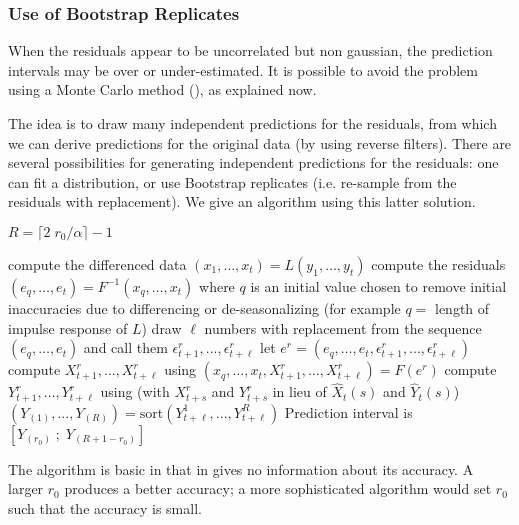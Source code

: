 \subsubsection{Use of Bootstrap Replicates}
\label{sec-mc-arma} When the residuals appear to be
uncorrelated but non gaussian, the prediction
intervals may be over or under-estimated. It is
possible to avoid the problem using a Monte Carlo
method (), as explained now.

The idea is to draw many independent predictions for
the residuals, from which we can derive predictions
for the original data (by using reverse filters).
There are several possibilities for generating
independent predictions for the residuals: one can fit
a distribution, or use Bootstrap replicates (i.e.
re-sample from the residuals with replacement). We
give an algorithm using this latter solution.

\begin{algorithm}
 \begin{algorithmic}[1]
%
  \State $R=\lceil 2 \;r_0/\alpha\rceil-1$ 

  \State compute the differenced data $(x_1,\ldots,x_t)=L(y_1,\ldots,y_t)$
  \State compute the residuals $(e_q,\ldots,e_t)=F^{-1}(x_q,\ldots,x_t)$ where
  $q$ is an initial value chosen to remove initial
  inaccuracies due to differencing or de-seasonalizing (for example $q=$
  length of impulse response of $L$)
    \State draw $\ell$ numbers with replacement from
the sequence $(e_q,\ldots,e_t)$ and call them
$\epsilon^r_{t+1},...,\epsilon^r_{t+\ell}$\label{line-draw-xrf}
    \State let $e^r=
(e_q,\ldots,e_t,\epsilon^r_{t+1},...,\epsilon^r_{t+\ell})$
    \State compute $X^r_{t+1},\ldots,X^r_{t+\ell}$ using
$(x_q,\ldots,x_t,X^r_{t+1},\ldots,X^r_{t+\ell})=F(e^r)$
    \State
compute $Y^r_{t+1},\ldots,Y^r_{t+\ell}$ using
 (with $X^r_{t+s}$ and
$Y^r_{t+s}$ in lieu of $\hat{X}_t(s)$ and
$\hat{Y}_t(s)$)
  \EndFor
  \State $\left(Y_{(1)},...,Y_{(R)}\right)=\mbox{sort}\left(Y^1_{t+\ell},...,Y^R_{t+\ell}\right)$
  \State Prediction interval is $[Y_{(r_0)}\;;\;Y_{(R+1-r_0)}]$
\end{algorithmic}\label{algo-mc-arma}
 \end{algorithm}
The algorithm is basic in that in gives no information
about its accuracy. A larger $r_0$ produces a better
accuracy; a more sophisticated algorithm would set
$r_0$ such that the accuracy is small.

